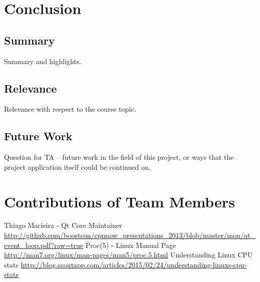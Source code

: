 \documentclass[12pt]{article}
\begin{document}
	\section{Conclusion}
	
	\subsection{Summary}
	Summary and highlights.
	
	\subsection{Relevance}
	Relevance with respect to the course topic.
	
	\subsection{Future Work}
	Question for TA -- future work in the field of this project, or ways that the project application itself could be continued on.
	
	
	\setcounter{secnumdepth}{0}
	\section{Contributions of Team Members}
	
	\begin{thebibliography}{3}
	 Thiago Macieira - Qt Core Maintainer \url{http://github.com/boostcon/cppnow_presentations_2013/blob/master/mon/qt_event_loop.pdf?raw=true}
	 Proc(5) - Linux Manual Page
	\url{http://man7.org/linux/man-pages/man5/proc.5.html}
	 Understanding Linux CPU stats \url{http://blog.scoutapp.com/articles/2015/02/24/understanding-linuxs-cpu-stats}
	\end{thebibliography}{}
\end{document}
